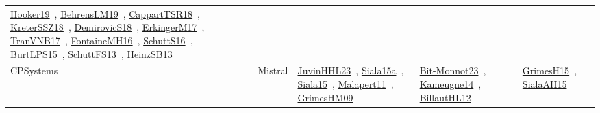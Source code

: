 {\begin{longtable}{lp{3cm}>{\raggedright\arraybackslash}p{6cm}>{\raggedright\arraybackslash}p{6cm}>{\raggedright\arraybackslash}p{8cm}}
\href{../works/Hooker19.pdf}{Hooker19}~\cite{Hooker19}, \href{../works/BehrensLM19.pdf}{BehrensLM19}~\cite{BehrensLM19}, \href{../works/CappartTSR18.pdf}{CappartTSR18}~\cite{CappartTSR18}, \href{../works/KreterSSZ18.pdf}{KreterSSZ18}~\cite{KreterSSZ18}, \href{../works/DemirovicS18.pdf}{DemirovicS18}~\cite{DemirovicS18}, \href{../works/ErkingerM17.pdf}{ErkingerM17}~\cite{ErkingerM17}, \href{../works/TranVNB17.pdf}{TranVNB17}~\cite{TranVNB17}, \href{../works/FontaineMH16.pdf}{FontaineMH16}~\cite{FontaineMH16}, \href{../works/SchuttS16.pdf}{SchuttS16}~\cite{SchuttS16}, \href{../works/BurtLPS15.pdf}{BurtLPS15}~\cite{BurtLPS15}, \href{../works/SchuttFS13.pdf}{SchuttFS13}~\cite{SchuttFS13}, \href{../works/HeinzSB13.pdf}{HeinzSB13}~\cite{HeinzSB13}\\
\index{Mistral}\index{CPSystems!Mistral}CPSystems & Mistral & \href{../works/JuvinHHL23.pdf}{JuvinHHL23}~\cite{JuvinHHL23}, \href{../works/Siala15a.pdf}{Siala15a}~\cite{Siala15a}, \href{../works/Siala15.pdf}{Siala15}~\cite{Siala15}, \href{../works/Malapert11.pdf}{Malapert11}~\cite{Malapert11}, \href{../works/GrimesHM09.pdf}{GrimesHM09}~\cite{GrimesHM09} & \href{../works/Bit-Monnot23.pdf}{Bit-Monnot23}~\cite{Bit-Monnot23}, \href{../works/Kameugne14.pdf}{Kameugne14}~\cite{Kameugne14}, \href{../works/BillautHL12.pdf}{BillautHL12}~\cite{BillautHL12} & \href{../works/GrimesH15.pdf}{GrimesH15}~\cite{GrimesH15}, \href{../works/SialaAH15.pdf}{SialaAH15}~\cite{SialaAH15}\\

\end{longtable}}
